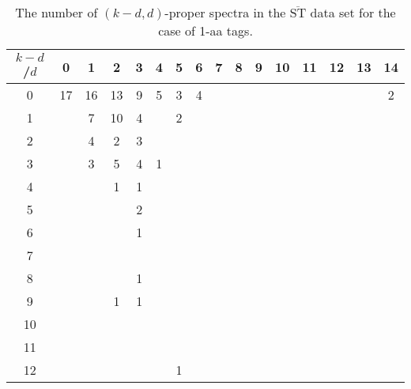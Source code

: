 \documentclass{article}[12pt]
\def\STbar{{\overline{\mathrm{ST}}}}
\begin{document}
\begin{landscape}

\begin{table}[h]\footnotesize
{\centering
\begin{tabular}{|c|c|
c|c|c|c|c|c|c|c|c|c|c|c|c|c|}
  \hline
  $k-d$/$d$ 
 & 0 & 1 & 2 & 3 & 4 & 5 & 6 & 7 & 8 & 9 & 10 & 11 & 12 & 13 & 14\\

  \hline
  \hline

0  & 17 & 16 & 13 & 9 & 5 & 3 & 4 &  &  &  &  &  &  &  & 2\\

1  &  & 7 & 10 & 4 &  & 2 &  &  &  &  &  &  &  &  & \\

2  &  & 4 & 2 & 3 &  &  &  &  &  &  &  &  &  &  & \\

3  &  & 3 & 5 & 4 & 1 &  &  &  &  &  &  &  &  &  & \\

4  &  &  & 1 & 1 &  &  &  &  &  &  &  &  &  &  & \\

5  &  &  &  & 2 &  &  &  &  &  &  &  &  &  &  & \\

6  &  &  &  & 1 &  &  &  &  &  &  &  &  &  &  & \\

7  &  &  &  &  &  &  &  &  &  &  &  &  &  &  & \\

8  &  &  &  & 1 &  &  &  &  &  &  &  &  &  &  & \\

9  &  &  & 1 & 1 &  &  &  &  &  &  &  &  &  &  & \\

10  &  &  &  &  &  &  &  &  &  &  &  &  &  &  & \\

11  &  &  &  &  &  &  &  &  &  &  &  &  &  &  & \\

12  &  &  &  &  &  & 1 &  &  &  &  &  &  &  &  & \\

  \hline
\end{tabular}
\par}
\centering
\caption{The number of $(k-d,d)$-proper spectra in the $\STbar$ data set for the case of 1-aa tags.}
\vspace{3mm}
\label{table:kd-1-proper-ST-bar}
\end{table}
\end{landscape}
\end{document}
